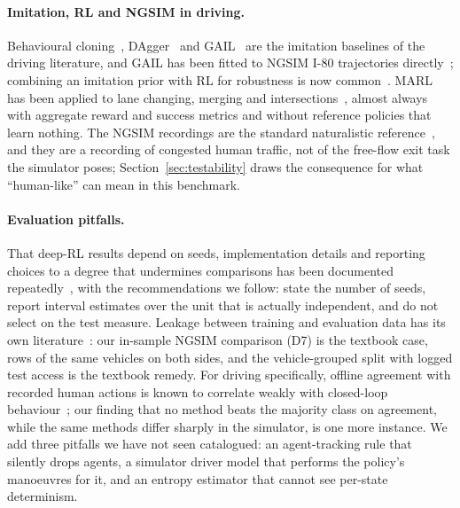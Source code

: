 \paragraph{Imitation, RL and NGSIM in driving.}
Behavioural cloning~\cite{pomerleau1991efficient,bojarski2016end,codevilla2018end}, DAgger~\cite{ross2011reduction} and GAIL~\cite{ho2016generative} are the imitation baselines of the driving literature, and GAIL has been fitted to NGSIM I-80 trajectories directly~\cite{kuefler2017imitating,bhattacharyya2022modeling}; combining an imitation prior with RL for robustness is now common~\cite{hester2018deep,rajeswaran2018learning,lu2023imitation}. MARL has been applied to lane changing, merging and intersections~\cite{zhou2020multi,shou2020multi,chen2020cooperative,chu2019multi,haydari2020deep,li2023reinforcement}, almost always with aggregate reward and success metrics and without reference policies that learn nothing. The NGSIM recordings are the standard naturalistic reference~\cite{ngsim2006,colyar2007us,montanino2015trajectory,wu2023human}, and they are a recording of congested human traffic, not of the free-flow exit task the simulator poses; Section~\ref{sec:testability} draws the consequence for what ``human-like'' can mean in this benchmark.

\paragraph{Evaluation pitfalls.}
That deep-RL results depend on seeds, implementation details and reporting choices to a degree that undermines comparisons has been documented repeatedly~\cite{henderson2018deep,colas2018seeds,agarwal2021precipice}, with the recommendations we follow: state the number of seeds, report interval estimates over the unit that is actually independent, and do not select on the test measure. Leakage between training and evaluation data has its own literature~\cite{kaufman2012leakage,kapoor2023leakage}: our in-sample NGSIM comparison (D7) is the textbook case, rows of the same vehicles on both sides, and the vehicle-grouped split with logged test access is the textbook remedy. For driving specifically, offline agreement with recorded human actions is known to correlate weakly with closed-loop behaviour~\cite{codevilla2018offline}; our finding that no method beats the majority class on agreement, while the same methods differ sharply in the simulator, is one more instance. We add three pitfalls we have not seen catalogued: an agent-tracking rule that silently drops agents, a simulator driver model that performs the policy's manoeuvres for it, and an entropy estimator that cannot see per-state determinism.

